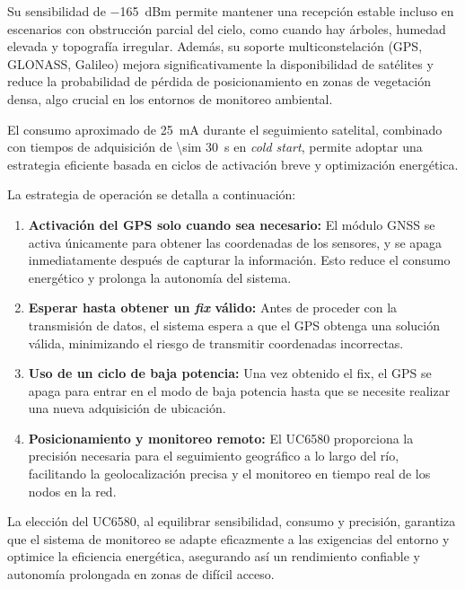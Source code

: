 Su sensibilidad de \SI{-165}{dBm} permite mantener una recepción estable incluso en escenarios con obstrucción parcial del cielo, como cuando hay árboles, humedad elevada y topografía irregular. Además, su soporte multiconstelación (GPS, GLONASS, Galileo) mejora significativamente la disponibilidad de satélites y reduce la probabilidad de pérdida de posicionamiento en zonas de vegetación densa, algo crucial en los entornos de monitoreo ambiental.

El consumo aproximado de \SI{25}{\milli\ampere} durante el seguimiento satelital, combinado con tiempos de adquisición de \SI{\sim 30}{\second} en \textit{cold start}, permite adoptar una estrategia eficiente basada en ciclos de activación breve y optimización energética.

La estrategia de operación se detalla a continuación:

\begin{enumerate}
    \item \textbf{Activación del GPS solo cuando sea necesario:} El módulo GNSS se activa únicamente para obtener las coordenadas de los sensores, y se apaga inmediatamente después de capturar la información. Esto reduce el consumo energético y prolonga la autonomía del sistema.
    
    \item \textbf{Esperar hasta obtener un \textit{fix} válido:} Antes de proceder con la transmisión de datos, el sistema espera a que el GPS obtenga una solución válida, minimizando el riesgo de transmitir coordenadas incorrectas.
    
    \item \textbf{Uso de un ciclo de baja potencia:} Una vez obtenido el fix, el GPS se apaga para entrar en el modo de baja potencia hasta que se necesite realizar una nueva adquisición de ubicación.
    
    \item \textbf{Posicionamiento y monitoreo remoto:} El UC6580 proporciona la precisión necesaria para el seguimiento geográfico a lo largo del río, facilitando la geolocalización precisa y el monitoreo en tiempo real de los nodos en la red.
\end{enumerate}

La elección del UC6580, al equilibrar sensibilidad, consumo y precisión, garantiza que el sistema de monitoreo se adapte eficazmente a las exigencias del entorno y optimice la eficiencia energética, asegurando así un rendimiento confiable y autonomía prolongada en zonas de difícil acceso.


